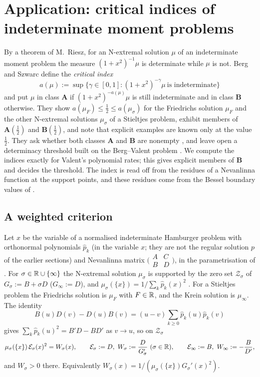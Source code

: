 \section{Application: critical indices of indeterminate moment problems}\label{sec:moments}

By a theorem of M.~Riesz, for an N-extremal solution $\mu$ of an indeterminate moment problem the
measure $(1+x^2)^{-1}\mu$ is determinate while $\mu$ is not. Berg and Szwarc \cite{BergSzwarc2026}
define the \emph{critical index}
\[
  a(\mu):=\sup\{\gamma\in[0,1]:(1+x^2)^{-\gamma}\mu\ \text{is indeterminate}\}
\]
and put $\mu$ in class $\mathbf A$ if $(1+x^2)^{-a(\mu)}\mu$ is still indeterminate and in class
$\mathbf B$ otherwise. They show $a(\mu_F)\le\frac12\le a(\mu_\sigma)$ for the Friedrichs solution
$\mu_F$ and the other N-extremal solutions $\mu_\sigma$ of a Stieltjes problem, exhibit members of
$\mathbf A(\frac12)$ and $\mathbf B(\frac12)$, and note that explicit examples are known only at the value
$\frac12$. They ask whether both classes $\mathbf A$ and $\mathbf B$ are nonempty \cite[after
Prop.~1.7]{BergSzwarc2026}, and leave open a determinacy threshold built on the Berg--Valent problem
\cite[Ex.~4.1]{BergSzwarc2026}. We compute the indices exactly for Valent's polynomial rates; this
gives explicit members of $\mathbf B$ and decides the threshold. The index is read off from the residues
of a Nevanlinna function at the support points, and these residues come from the Bessel boundary
values of .

\subsection{A weighted criterion}

Let $x$ be the variable of a normalised indeterminate Hamburger problem with orthonormal
polynomials $\hat p_k$ (in the variable $x$; they are not the regular solution $p$ of the earlier
sections) and Nevanlinna matrix $\bigl(\begin{smallmatrix}A&C\\B&D\end{smallmatrix}\bigr)$, in the
parametrisation of \cite{BergSzwarc2026}. For $\sigma\in\mathbb{R}\cup\{\infty\}$ the N-extremal solution
$\mu_\sigma$ is supported by the zero set $\mathcal Z_\sigma$ of $G_\sigma:=B+\sigma D$ ($G_\infty:=D$), and
$\mu_\sigma(\{x\})=1/\sum_k\hat p_k(x)^2$ \cite[Prop.~1.4]{BergSzwarc2026}. For a Stieltjes problem the
Friedrichs solution is $\mu_F$ with $F\in\mathbb{R}$, and the Krein solution is $\mu_\infty$. The identity
\begin{equation}\label{eq:BD-CD}
  B(u)D(v)-D(u)B(v)=(u-v)\sum_{k\ge0}\hat p_k(u)\hat p_k(v)
\end{equation}
\cite[first proof of Prop.~2.3]{BergSzwarcII} gives $\sum_k\hat p_k(u)^2=B'D-BD'$ as $v\to u$, so on
$\mathcal Z_\sigma$
\begin{equation}\label{eq:Wsigma}
  \mu_\sigma(\{x\})\,\mathcal E_\sigma(x)^2=W_\sigma(x),\qquad
  \mathcal E_\sigma:=D,\ W_\sigma:=\frac{D}{G_\sigma'}\ (\sigma\in\RR),\qquad
  \mathcal E_\infty:=B,\ W_\infty:=-\frac{B}{D'},
\end{equation}
and $W_\sigma>0$ there. Equivalently $W_\sigma(x)=1/(\mu_\sigma(\{x\})G_\sigma'(x)^2)$.

